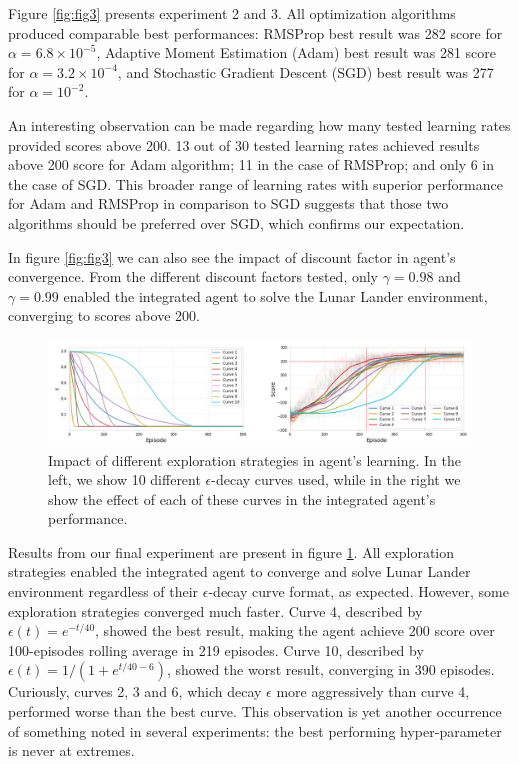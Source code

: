\documentclass{article}
\begin{document}
    Figure \ref{fig:fig3} presents experiment 2 and 3.
    All optimization algorithms produced comparable best performances: RMSProp best result was 282 score for $\alpha = 6.8 \times 10^{-5}$, Adaptive Moment Estimation (Adam) best result was 281 score for $\alpha = 3.2 \times 10^{-4}$, and Stochastic Gradient Descent (SGD) best result was 277 for $\alpha = 10^{-2}$.

    An interesting observation can be made regarding how many tested learning rates provided scores above 200.
    13 out of 30 tested learning rates achieved results above 200 score for Adam algorithm;
    11 in the case of RMSProp;
    and only 6 in the case of SGD.
    This broader range of learning rates with superior performance for Adam and RMSProp in comparison to SGD suggests that those two algorithms should be preferred over SGD, which confirms our expectation.

    In figure \ref{fig:fig3} we can also see the impact of discount factor in agent's convergence.
    From the different discount factors tested, only $\gamma = 0.98$ and $\gamma = 0.99$ enabled the integrated agent to solve the Lunar Lander environment, converging to scores above 200.

    \begin{figure}[h]
        \includegraphics[width=\textwidth]{./images/fig4.png}
        \centering
        \caption{Impact of different exploration strategies in agent's learning.
        In the left, we show 10 different $\epsilon$-decay curves used, while in the right we show the effect of each of these curves in the integrated agent's performance.}
        \label{fig:fig4}
    \end{figure}

    Results from our final experiment are present in figure \ref{fig:fig4}.
    All exploration strategies enabled the integrated agent to converge and solve Lunar Lander environment regardless of their $\epsilon$-decay curve format, as expected.
    However, some exploration strategies converged much faster.
    Curve 4, described by $\epsilon(t) = e^{-t / 40}$, showed the best result, making the agent achieve 200 score over 100-episodes rolling average in 219 episodes.
    Curve 10, described by $\epsilon(t) = 1 / (1 + e^{t/40 - 6})$, showed the worst result, converging in 390 episodes.
    Curiously, curves 2, 3 and 6, which decay $\epsilon$ more aggressively than curve 4, performed worse than the best curve.
    This observation is yet another occurrence of something noted in several experiments: the best performing hyper-parameter is never at extremes.
\end{document}
